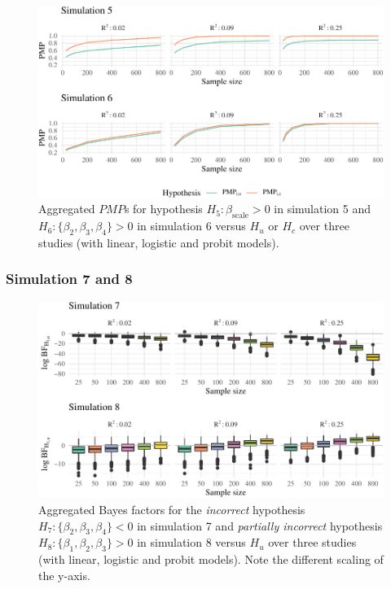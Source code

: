 \documentclass[review, 3p, authoryear]{elsarticle} %
\begin{document}
\begin{figure}
\includegraphics[width=1\linewidth]{manuscript_volker_files/figure-latex/PMP56-1} \caption{Aggregated $PMP$s for hypothesis $H_5: \beta_{\text{scale}} > 0$ in simulation 5 and $H_6: \{\beta_2, \beta_3, \beta_4\} > 0$ in simulation 6 versus $H_u$ or $H_c$ over three studies (with linear, logistic and probit models).}\label{fig:PMP56}
\end{figure}

\hypertarget{simulation-7-and-8}{%
\subsubsection{Simulation 7 and 8}\label{simulation-7-and-8}}

\begin{figure}
\includegraphics[width=1\linewidth]{manuscript_volker_files/figure-latex/BF78-1} \caption{Aggregated Bayes factors for the \textit{incorrect} hypothesis $H_7: \{\beta_2, \beta_3, \beta_4\} < 0$ in simulation 7 and \textit{partially incorrect} hypothesis $H_8: \{\beta_1, \beta_2, \beta_3\} > 0$ in simulation 8 versus $H_u$ over three studies (with linear, logistic and probit models). Note the different scaling of the y-axis.}\label{fig:BF78}
\end{figure}
\end{document}
